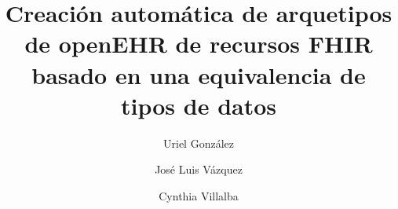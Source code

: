 \title{Creación automática de arquetipos de openEHR de recursos FHIR basado en una equivalencia de tipos de datos}
\author{Uriel González \and José Luis Vázquez \and Cynthia Villalba}
\maketitle
